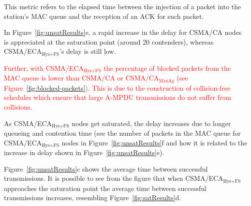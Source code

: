 	This metric refers to the elapsed time between the injection of a packet into the station's MAC queue and the reception of an ACK for such packet. 
	
	In Figure~\ref{fig:unsatResults}e, a rapid increase in the delay for CSMA/CA nodes is appreciated at the saturation point (around 20 contenders), whereas CSMA/ECA$_{\text{Hys+FS}}$'s delay is still low. 
	
	\textcolor{red}{Further, with CSMA/ECA$_{\text{Hys+FS}}$ the percentage of blocked packets from the MAC queue is lower than CSMA/CA or CSMA/CA$_{\text{MaxAg}}$ (see Figure~\ref{fig:blocked-packets}). This is due to the construction of collision-free schedules which ensure that large A-MPDU transmissions do not suffer from collisions.}
	
	As CSMA/ECA$_{\text{Hys+FS}}$ nodes get saturated, the delay increases due to longer queueing and contention time (see the number of packets in the MAC queue for CSMA/ECA$_{\text{Hys+FS}}$ nodes in Figure~\ref{fig:unsatResults}f and how it is related to the increase in delay shown in Figure~\ref{fig:unsatResults}e).
	
	
	Figure~\ref{fig:unsatResults}c shows the average time between successful transmissions. It is possible to see from the figure that when CSMA/ECA$_{\text{Hys+FS}}$ approaches the saturation point the average time between successful transmissions increases, resembling Figure~\ref{fig:satResults}d. 
	
	
%	
	
